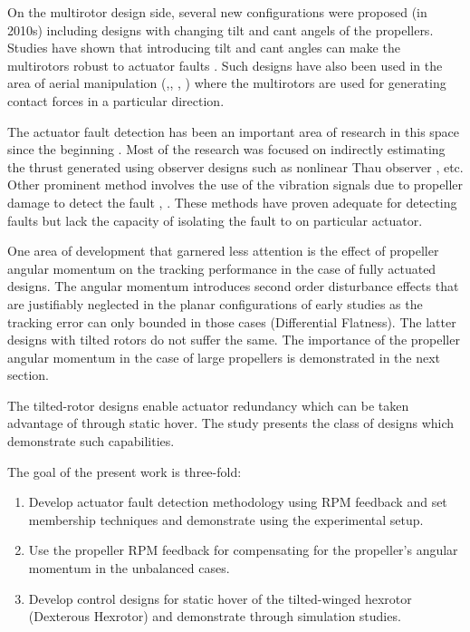 \par On the multirotor design side, several new configurations were proposed (in 2010s) including designs with changing tilt and cant angels of the propellers. Studies have shown that introducing tilt and cant angles can make the multirotors robust to actuator faults \cite{Rajappa2015}. Such designs have also been used in the area of aerial manipulation (\cite{Tognon2019},\cite{Nava2020}, \cite{lulu1}, \cite{lulu2}) where the multirotors are used for generating contact forces in a particular direction.

\par The actuator fault detection has been an important area of research in this space since the beginning \cite{6935563}. Most of the research was focused on indirectly estimating the thrust generated using observer designs such as nonlinear Thau observer \cite{hasan2018model}, etc. Other prominent method involves the use of the vibration signals due to propeller damage to detect the fault \cite{puchalski2022actuator}, \cite{thanaraj2023actuator}. These methods have proven adequate for detecting faults but lack the capacity of isolating the fault to on particular actuator.

\par One area of development that garnered less attention is the effect of propeller angular momentum on the tracking
performance in the case of fully actuated designs. The angular momentum introduces second order disturbance effects that
are justifiably neglected in the planar configurations of early studies as the tracking error can only bounded in those cases (Differential Flatness). The latter designs with tilted rotors do not suffer the same. The importance of the propeller angular momentum in the case of large propellers is demonstrated in the next section.

\par The tilted-rotor designs enable actuator redundancy which can be taken advantage of through static hover\cite{Bicego2020}. The study \cite{Michieletto2018} presents the class of designs which demonstrate such capabilities.

\par The goal of the present work is three-fold:
\begin{enumerate}
        \item Develop actuator fault detection methodology using RPM feedback and set membership techniques and demonstrate using the experimental setup.
        \item Use the propeller RPM feedback for compensating for the propeller's angular momentum in the unbalanced cases.
        \item Develop control designs for static hover of the tilted-winged hexrotor (Dexterous Hexrotor) and demonstrate through simulation studies.
\end{enumerate}


